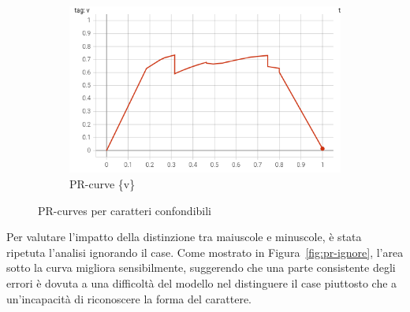 \begin{figure}[htbp]
\begin{subfigure}[t]{0.32\textwidth}
        \centering
        \includegraphics[width=\textwidth]{images/pr_curve_conf3.png}
        \caption{PR-curve \{v\}}
    \end{subfigure}
    \caption{PR-curves per caratteri confondibili}
    \label{fig:pr-confondibili}
\end{figure}

Per valutare l'impatto della distinzione tra maiuscole e minuscole, è stata ripetuta l'analisi ignorando il case. Come mostrato in Figura~\ref{fig:pr-ignore}, l'area sotto la curva migliora sensibilmente, suggerendo che una parte consistente degli errori è dovuta a una difficoltà del modello nel distinguere il case piuttosto che a un'incapacità di riconoscere la forma del carattere.

